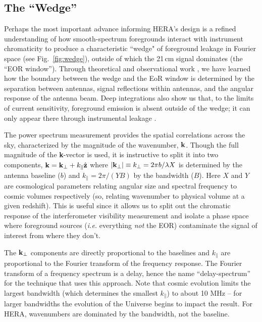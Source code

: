 \documentclass[preprint,11pt]{aastex}
\newcommand{\kvec}{{\bf k}}
\newcommand{\kpr}{{k_\perp}}
\newcommand{\kvpr}{{\kvec_\perp}}
\def\kpar{k_{\|}}
\begin{document}
\subsection{The ``Wedge''}
\label{sec:wedge}
Perhaps the most important advance informing HERA's design is a
refined understanding of how smooth-spectrum foregrounds interact
with instrument chromaticity to produce a characteristic ``wedge" of
foreground leakage in Fourier space (see Fig.~\ref{fig:wedge}), 
outside of which the 21\,cm signal dominates (the ``EOR window'').  
Through theoretical and observational work
\citep{datta_etal2010,morales_et_al2012,parsons_et_al2012b,vedantham_2012,thyagarajan_et_al2013,hazelton_et_al2013,pober_etal2013b,liu_et_al2014a,liu_et_al2014b},
we have learned how the boundary between the wedge and  the EoR window is determined by the separation between antennas,
signal reflections within antennas, and the angular response of the antenna beam.  Deep integrations also show us
that, to the limits of current sensitivity, foreground emission is absent outside of the wedge; it can only 
appear there through instrumental leakage \citep{parsons_etal2014,ali_et_al2015,moore_et_al2016,kohn_et_al2016}.

The power spectrum measurement provides the spatial correlations across the sky, characterized by the magnitude of the wavenumber, ${\bf k}$.
Though the full magnitude of the {\bf k}-vector is used, it is instructive to split it into two components,  $\kvec =  \kvpr + \kpar{\hat {\bf z}}$ where $|\kvpr|\equiv \kpr = 2\pi b/\lambda X$ is determined by the antenna baseline ($b$) and $\kpar=2\pi/(YB)$ by the bandwidth ($B$).  Here $X$ and $Y$ are cosmological parameters relating angular size and spectral frequency to cosmic volumes respectively (so, relating wavenumber to physical volume at a given redshift).  This is useful since it allows us to split out the chromatic response of the interferometer visibility measurement and isolate a phase space where foreground sources ({\em i.e.} everything {\em not} the EOR) contaminate the signal of interest from where they don't.  

The $\kvpr$ components are directly proportional to the baselines and $\kpar$ are proportional to the Fourier transform of the frequency response.   The Fourier transform of a frequency spectrum is a delay, hence the name ``delay-spectrum'' for the technique that uses this approach.  Note that cosmic evolution limits the largest bandwidth (which determines the smallest $\kpar$) to about 10 MHz -- for larger bandwidths the evolution of the Universe begins to impact the result.  For HERA, wavenumbers are dominated by the bandwidth, not the baseline.
\end{document}
